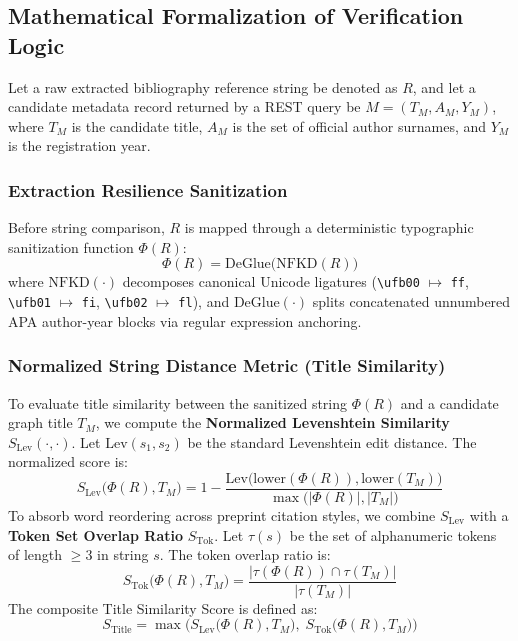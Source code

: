 \documentclass[11pt, a4paper]{article}
\begin{document}
\subsection{Mathematical Formalization of Verification Logic}
Let a raw extracted bibliography reference string be denoted as $R$, and let a candidate metadata record returned by a REST query be $M = (T_M, A_M, Y_M)$, where $T_M$ is the candidate title, $A_M$ is the set of official author surnames, and $Y_M$ is the registration year.

\subsubsection{Extraction Resilience Sanitization}
Before string comparison, $R$ is mapped through a deterministic typographic sanitization function $\Phi(R)$:
$$\Phi(R) = \text{DeGlue}\big(\text{NFKD}(R)\big)$$
where $\text{NFKD}(\cdot)$ decomposes canonical Unicode ligatures (\texttt{\textbackslash ufb00} $\mapsto$ \texttt{ff}, \texttt{\textbackslash ufb01} $\mapsto$ \texttt{fi}, \texttt{\textbackslash ufb02} $\mapsto$ \texttt{fl}), and $\text{DeGlue}(\cdot)$ splits concatenated unnumbered APA author-year blocks via regular expression anchoring.

\subsubsection{Normalized String Distance Metric (Title Similarity)}
To evaluate title similarity between the sanitized string $\Phi(R)$ and a candidate graph title $T_M$, we compute the \textbf{Normalized Levenshtein Similarity} $S_{\text{Lev}}(\cdot, \cdot)$. Let $\text{Lev}(s_1, s_2)$ be the standard Levenshtein edit distance. The normalized score is:
$$S_{\text{Lev}}\big(\Phi(R), T_M\big) = 1 - \frac{\text{Lev}\big(\text{lower}(\Phi(R)), \text{lower}(T_M)\big)}{\max\big(|\Phi(R)|, |T_M|\big)}$$
To absorb word reordering across preprint citation styles, we combine $S_{\text{Lev}}$ with a \textbf{Token Set Overlap Ratio} $S_{\text{Tok}}$. Let $\tau(s)$ be the set of alphanumeric tokens of length $\ge 3$ in string $s$. The token overlap ratio is:
$$S_{\text{Tok}}\big(\Phi(R), T_M\big) = \frac{|\tau(\Phi(R)) \cap \tau(T_M)|}{|\tau(T_M)|}$$
The composite Title Similarity Score is defined as:
$$S_{\text{Title}} = \max\Big(S_{\text{Lev}}\big(\Phi(R), T_M\big), \; S_{\text{Tok}}\big(\Phi(R), T_M\big)\Big)$$
\end{document}
